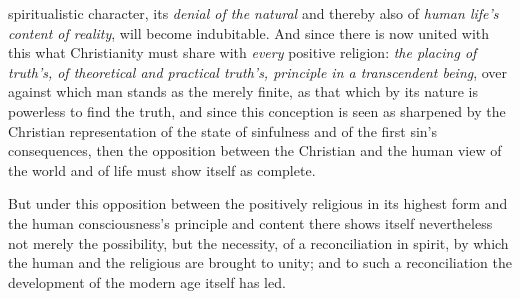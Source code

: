 \documentclass[12pt,a4paper]{book}
\begin{document}
\begin{enumerate}[label=\arabic*., leftmargin=*, labelsep=1em,
                  topsep=0.35\baselineskip, itemsep=0.35\baselineskip]
{  spiritualistic} character, its \emph{denial of the natural} and thereby also
  of \emph{human life's content of reality}, will become indubitable. And since
  there is now united with this what Christianity must share with \emph{every}
  positive religion: \emph{the placing of truth's, of theoretical and practical
  truth's, principle in a transcendent being}, over against which man stands as
  the merely finite, as that which by its nature is powerless to find the truth,
  and since this conception is seen as sharpened by the Christian representation
  of the state of sinfulness and of the first sin's consequences, then the
  opposition between the Christian and the human view of the world and of life
  must show itself as complete.

  But under this opposition between the positively religious in its highest form
  and the human consciousness's principle and content there shows itself
  nevertheless not merely the possibility, but the necessity, of a
  reconciliation in spirit, by which the human and the religious are brought to
  unity; and to such a reconciliation the development of the modern age itself
  has led.


\end{enumerate}
\end{document}
